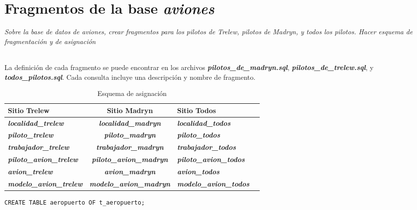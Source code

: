 \section{Fragmentos de la base \emph{aviones}}
\emph{Sobre la base de datos de aviones, crear fragmentos para los pilotos de Trelew, pilotos de Madryn, y todos los pilotos. Hacer esquema de fragmentación y de asignación} 

~\\

La definición de cada fragmento se puede encontrar en los archivos \textbf{\emph{pilotos\_de\_madryn.sql}}, \textbf{\emph{pilotos\_de\_trelew.sql}}, y \textbf{\emph{todos\_pilotos.sql}}. Cada consulta incluye una descripción y nombre de fragmento.

\begin{center}
    \begin{table}[H]
        \begin{tabular}{| p{5cm} | c | p{5cm} | p{4cm} |}
            \hline
            Sitio Trelew & Sitio Madryn & Sitio Todos\\ \hline
            \textbf{\emph{localidad\_trelew}} & \textbf{\emph{localidad\_madryn}} & \textbf{\emph{localidad\_todos}}\\ \hline
            \textbf{\emph{piloto\_trelew}} & \textbf{\emph{piloto\_madryn}} & \textbf{\emph{piloto\_todos}}\\ \hline
            \textbf{\emph{trabajador\_trelew}} & \textbf{\emph{trabajador\_madryn}} & \textbf{\emph{trabajador\_todos}}\\ \hline
            \textbf{\emph{piloto\_avion\_trelew}} & \textbf{\emph{piloto\_avion\_madryn}} & \textbf{\emph{piloto\_avion\_todos}}\\ \hline
            \textbf{\emph{avion\_trelew}} & \textbf{\emph{avion\_madryn}} & \textbf{\emph{avion\_todos}}\\ \hline
            \textbf{\emph{modelo\_avion\_trelew}} & \textbf{\emph{modelo\_avion\_madryn}} & \textbf{\emph{modelo\_avion\_todos}}\\ \hline
        \end{tabular}
    \caption{\label{tab:table-name}Esquema de asignación}
    \end{table}
\end{center}










\clearpage
\printbibliography




\vspace*{5mm}
\lstset{style=sql}
\begin{lstlisting}
CREATE TABLE aeropuerto OF t_aeropuerto;
\end{lstlisting}
